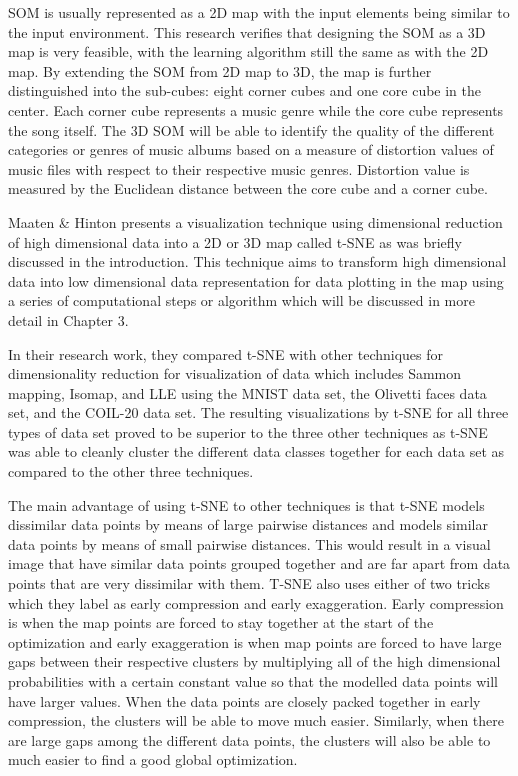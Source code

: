 	SOM is usually represented as a 2D map with the input elements being similar to the input environment. This research verifies that designing the SOM as a 3D map is very feasible, with the learning algorithm still the same as with the 2D map. By extending the SOM from 2D map to 3D, the map is further distinguished into the sub-cubes: eight corner cubes and one core cube in the center. Each corner cube represents a music genre while the core cube represents the song itself. The 3D SOM will be able to identify the quality of the different categories or genres of music albums based on a measure of distortion values of music files with respect to their respective music genres. Distortion value is measured by the Euclidean distance between the core cube and a corner cube.

	Maaten \& Hinton presents a visualization technique using dimensional reduction of high dimensional data into a 2D or 3D map called t-SNE as was briefly discussed in the introduction. This technique aims to transform high dimensional data into low dimensional data representation for data plotting in the map using a series of computational steps or algorithm which will be discussed in more detail in Chapter 3.

	In their research work, they compared t-SNE with other techniques for dimensionality reduction for visualization of data which includes Sammon mapping, Isomap, and LLE using the MNIST data set, the Olivetti faces data set, and the COIL-20 data set. The resulting visualizations by t-SNE for all three types of data set proved to be superior to the three other techniques as t-SNE was able to cleanly cluster the different data classes together for each data set as compared to the other three techniques.

	The main advantage of using t-SNE to other techniques is that t-SNE models dissimilar data points by means of large pairwise distances and models similar data points by means of small pairwise distances. This would result in a visual image that have similar data points grouped together and are far apart from data points that are very dissimilar with them. T-SNE also uses either of two tricks which they label as early compression and early exaggeration. Early compression is when the map points are forced to stay together at the start of the optimization and early exaggeration is when map points are forced to have large gaps between their respective clusters by multiplying all of the high dimensional probabilities with a certain constant value so that the modelled data points will have larger values. When the data points are closely packed together in early compression, the clusters will be able to move much easier. Similarly, when there are large gaps among the different data points, the clusters will also be able to much easier to find a good global optimization.

